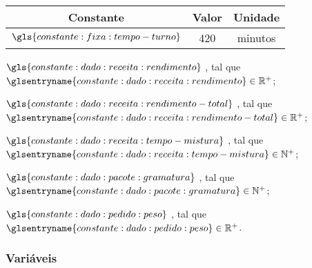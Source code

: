 \begin{quadro}
    \caption{%
        \label{qua:constantes-fixas}%
        Constantes do problema.
    }

    \begin{tabular}{|c|c|c|}
        \hline
        Constante                              &
        Valor                                  &
        Unidade
        \\
        \hline
        \( \gls{constante:fixa:tempo-turno} \) &
        420                                    &
        minutos
        \\
        \hline
    \end{tabular}

    \fonte{\ComponenteFontePropria{}}
\end{quadro}


\begin{symbols}
    \item[\( \gls{constante:dado:receita:rendimento} \)]
    ,
    tal que \( \glsentryname{constante:dado:receita:rendimento} \in \mathbb{R}^{+} \);

    \item[\( \gls{constante:dado:receita:rendimento-total} \)]
    ,
    tal que \( \glsentryname{constante:dado:receita:rendimento-total} \in \mathbb{R}^{+} \);

    \item[\( \gls{constante:dado:receita:tempo-mistura} \)]
    ,
    tal que \( \glsentryname{constante:dado:receita:tempo-mistura} \in \mathbb{N}^{+} \);

    \item[\( \gls{constante:dado:pacote:gramatura} \)]
    ,
    tal que \( \glsentryname{constante:dado:pacote:gramatura} \in \mathbb{N}^{+} \);

    \item[\( \gls{constante:dado:pedido:peso} \)]
    ,
    tal que \( \glsentryname{constante:dado:pedido:peso} \in \mathbb{R}^{+} \).
\end{symbols}

\subsubsection{Variáveis}

